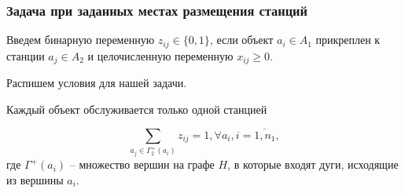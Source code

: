 \begin{frame}
    \frametitle{Задача при заданных местах размещения станций}
    \fontsize{10pt}{5.2}\selectfont
    \justifying

    
    Введем бинарную переменную $z_{ij} \in \{0, 1\}$, если объект $a_i \in A_1$ прикреплен к станции $a_j  \in A_2$ и целочисленную переменную $x_{ij} \geqslant 0$.

    \bigskip
    Распишем условия для нашей задачи.
    
    \bigskip

    Каждый объект обслуживается только одной станцией

    \begin{equation}\label{eq:part2_1.1}
        \sum_{a_j \in \Gamma_2^+(a_i)} z_{ij} = 1, \forall a_i, i=\overline{1, n_1},
    \end{equation}
    где $\Gamma^+(a_i)$ – множество вершин на графе $H$, в которые входят дуги, исходящие из вершины $a_i$.
    
    \bigskip
   

\end{frame}


